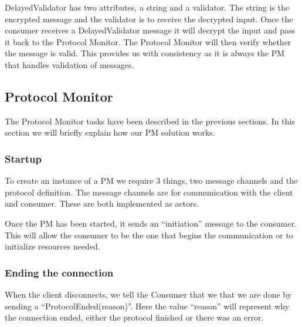 DelayedValidator has two attributes, a string and a validator. The string is the encrypted message and the validator is to receive the decrypted input. Once the consumer receives a DelayedValidator message it will decrypt the input and pass it back to the Protocol Monitor. The Protocol Monitor will then verify whether the message is valid. This provides us with consistency as it is always the PM that handles validation of messages.
   
%


\subsection{Protocol Monitor}
The Protocol Monitor tasks have been described in the previous sections. In this section we will briefly explain how our PM solution works.
\subsubsection{Startup}
To create an instance of a PM we require 3 things, two message channels and the protocol definition. The message channels are for communication with the client and consumer. These are both implemented as actors. 

Once the PM has been started, it sends an ``initiation'' message to the consumer. This will allow the consumer to be the one that begins the communication or to initialize resources needed.

\subsubsection{Ending the connection}
When the client disconnects, we tell the Consumer that we that we are done by sending a ``ProtocolEnded(reason)''. Here the value ``reason'' will represent why the connection ended, either the protocol finished or there was an error.

%




